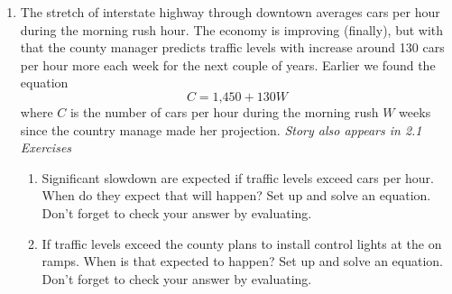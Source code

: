 \begin{enumerate}
\item The stretch of interstate highway through downtown averages  cars per hour during the morning rush hour.  The economy is improving (finally), but with that the county manager predicts traffic levels with increase around 130 cars per hour more each week for the next couple of years. Earlier we found the equation $$C=\text{1,450} + 130W$$ where $C$ is the number of cars per hour during the morning rush $W$ weeks since the country manage made her projection.   \hfill \emph{Story also appears in 2.1 Exercises}
\begin{enumerate}
\item Significant slowdown are expected if traffic levels exceed  cars per hour.  When do they expect that will happen? Set up and solve an equation.  Don't forget to check your answer by evaluating.
\item If traffic levels exceed  the county plans to install control lights at the on ramps.  When is that expected to happen?   Set up and solve an equation.  Don't forget to check your answer by evaluating.
\end{enumerate} 


\end{enumerate}
